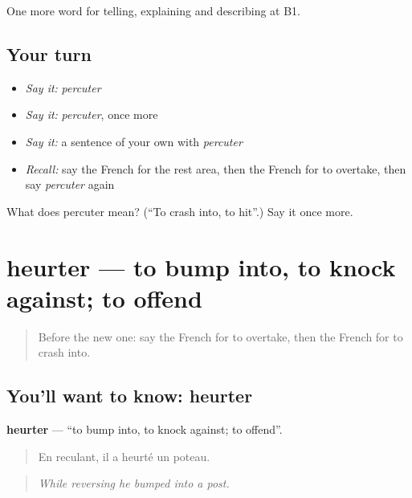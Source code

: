 \begin{grammarlens}[title={What you've built}]
One more word for telling, explaining and describing at B1.
\end{grammarlens}

\subsection*{Your turn}
\begin{itemize}
\raggedright
  \item \emph{Say it:} \emph{percuter}
  \item \emph{Say it:} \emph{percuter}, once more
  \item \emph{Say it:} a sentence of your own with \emph{percuter}
  \item \emph{Recall:} say the French for the rest area, then the French for to overtake, then say \emph{percuter} again
\end{itemize}

\begin{tcolorbox}[breakable,colback=teal!4,colframe=teal!35!black,title={Before you move on}]
What does percuter mean? (\textquotedblleft{}To crash into, to hit\textquotedblright{}.) Say it once more.
\end{tcolorbox}
\section[heurter]{heurter — to bump into, to knock against; to offend}

\label{lesson:FR-C411-heurter}



\begin{quote}
Before the new one: say the French for to overtake, then the French for to crash into.
\end{quote}

\subsection*{You'll want to know: heurter}
\textbf{heurter} — \textquotedblleft{}to bump into, to knock against; to offend\textquotedblright{}.

\begin{quote}
En reculant, il a heurté un poteau.
\end{quote}

\begin{quote}
\emph{While reversing he bumped into a post.}
\end{quote}

